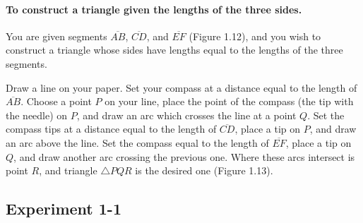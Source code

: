 \documentclass[12pt]{book} %
\begin{document}
\paragraph{To construct a triangle given the lengths of the three sides.}
You are given segments $\overline{AB}$, $\overline{CD}$, and $\overline{EF}$ (Figure 1.12), and you wish to construct a triangle whose sides have lengths equal to the lengths of the three segments.


Draw a line on your paper. Set your compass at a distance equal to the length of $\overline{AB}$. Choose a point $P$ on your line, place the point of the compass (the tip with the needle) on $P$, and draw an arc which crosses the line at a point $Q$. Set the compass tips at a distance equal to the length of $\overline{CD}$, place a tip on $P$, and draw an arc above the line. Set the compass equal to the length of $\overline{EF}$, place a tip on $Q$, and draw another arc crossing the previous one. Where these arcs intersect is point $R$, and triangle $\triangle PQR$ is the desired one (Figure 1.13).


\subsection*{Experiment 1-1}
\end{document}
